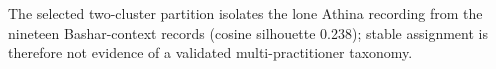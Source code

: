 The selected two-cluster partition isolates the lone Athina recording from the nineteen Bashar-context records (cosine silhouette 0.238); stable assignment is therefore not evidence of a validated multi-practitioner taxonomy.
